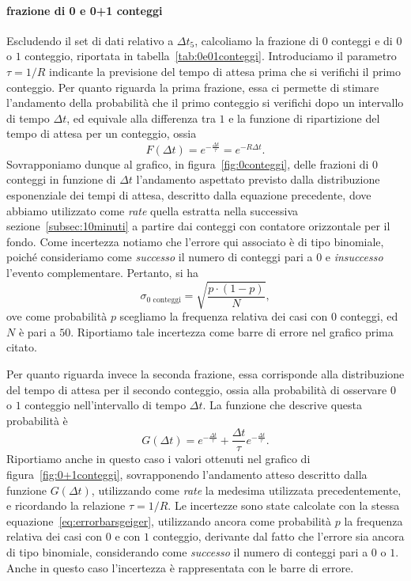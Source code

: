 \documentclass[10pt,oneside,a4paper]{article}
\begin{document}
\paragraph{frazione di 0 e 0+1 conteggi} 
Escludendo il set di dati relativo a $\Delta t_5$, calcoliamo la frazione di $0$ conteggi e di $0$ o $1$ conteggio, riportata in tabella~\ref{tab:0e01conteggi}. Introduciamo il parametro $\tau = 1/R$ indicante la previsione del tempo di attesa prima che si verifichi il primo conteggio. Per quanto riguarda la prima frazione, essa ci permette di stimare l'andamento della probabilità che il primo conteggio si verifichi dopo un intervallo di tempo $\Delta t$, ed equivale alla differenza tra $1$ e la funzione di ripartizione del tempo di attesa per un conteggio, ossia
\[
F(\Delta t) = e^{-\frac{\Delta t}{\tau}} = e^{-R\Delta t}.
\]
Sovrapponiamo dunque al grafico, in figura~\ref{fig:0conteggi}, delle frazioni di $0$ conteggi in funzione di $\Delta t$ l'andamento aspettato previsto dalla distribuzione esponenziale dei tempi di attesa, descritto dalla equazione precedente, dove abbiamo utilizzato come \emph{rate} quella estratta nella successiva sezione~\ref{subsec:10minuti} a partire dai conteggi con contatore orizzontale per il fondo. Come incertezza notiamo che l'errore qui associato è di tipo binomiale, poiché consideriamo come \emph{successo} il numero di conteggi pari a $0$ e \emph{insuccesso} l'evento complementare. Pertanto, si ha
\begin{equation}\label{eq:errorbarsgeiger}
\sigma_{\text{$0$ conteggi}} = \sqrt{\frac{p\cdot(1-p)}{N}},
\end{equation}
ove come probabilità $p$ scegliamo la frequenza relativa dei casi con $0$ conteggi, ed $N$ è pari a $50$. Riportiamo tale incertezza come barre di errore nel grafico prima citato.

Per quanto riguarda invece la seconda frazione, essa corrisponde alla distribuzione del tempo di attesa per il secondo conteggio, ossia alla probabilità di osservare $0$ o $1$ conteggio nell'intervallo di tempo $\Delta t$. La funzione che descrive questa probabilità è
\[
G(\Delta t) = e^{-\frac{\Delta t}{\tau}} + \frac{\Delta t}{\tau} e^{-\frac{\Delta t}{\tau}}.
\]
Riportiamo anche in questo caso i valori ottenuti nel grafico di figura~\ref{fig:0+1conteggi}, sovrapponendo l'andamento atteso descritto dalla funzione $G(\Delta t)$, utilizzando come \emph{rate} la medesima utilizzata precedentemente, e ricordando la relazione $\tau = 1 / R$. Le incertezze sono state calcolate con la stessa equazione~\ref{eq:errorbarsgeiger}, utilizzando ancora come probabilità $p$ la frequenza relativa dei casi con $0$ e con $1$ conteggio, derivante dal fatto che l'errore sia ancora di tipo binomiale, considerando come \emph{successo} il numero di conteggi pari a $0$ o $1$. Anche in questo caso l'incertezza è rappresentata con le barre di errore.
\end{document}
